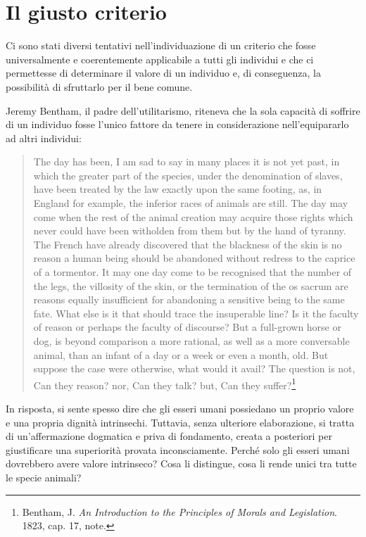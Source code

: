 \chapter{Il giusto criterio}
\label{ch:il-giusto-criterio}

Ci sono stati diversi tentativi nell'individuazione di un criterio che fosse universalmente e
coerentemente applicabile a tutti gli individui e che ci permettesse di determinare il valore di un
individuo e, di conseguenza, la possibilità di sfruttarlo per il bene comune.

Jeremy Bentham, il padre dell'utilitarismo, riteneva che la sola capacità di soffrire di un
individuo fosse l'unico fattore da tenere in considerazione nell'equipararlo ad altri individui:

\begin{quotation}

    The day has been, I am sad to say in many places it is not yet past, in which the greater part
    of the species, under the denomination of slaves, have been treated by the law exactly upon the
    same footing, as, in England for example, the inferior races of animals are still. The day may
    come when the rest of the animal creation may acquire those rights which never could have been
    witholden from them but by the hand of tyranny. The French have already discovered that the
    blackness of the skin is no reason a human being should be abandoned without redress to the
    caprice of a tormentor. It may one day come to be recognised that the number of the legs, the
    villosity of the skin, or the termination of the os sacrum are reasons equally insufficient for
    abandoning a sensitive being to the same fate. What else is it that should trace the insuperable
    line? Is it the faculty of reason or perhaps the faculty of discourse? But a full-grown horse or
    dog, is beyond comparison a more rational, as well as a more conversable animal, than an infant
    of a day or a week or even a month, old. But suppose the case were otherwise, what would it
    avail? The question is not, Can they reason? nor, Can they talk? but, Can they
    suffer?\footnote{Bentham, J. \emph{An Introduction to the Principles of Morals and Legislation}.
    1823, cap. 17, note.}

\end{quotation}

In risposta, si sente spesso dire che gli esseri umani possiedano un proprio valore e una propria
dignità intrinsechi. Tuttavia, senza ulteriore elaborazione, si tratta di un'affermazione dogmatica
e priva di fondamento, creata a posteriori per giustificare una superiorità provata inconsciamente.
Perché solo gli esseri umani dovrebbero avere valore intrinseco? Cosa li distingue, cosa li rende
unici tra tutte le specie animali?

